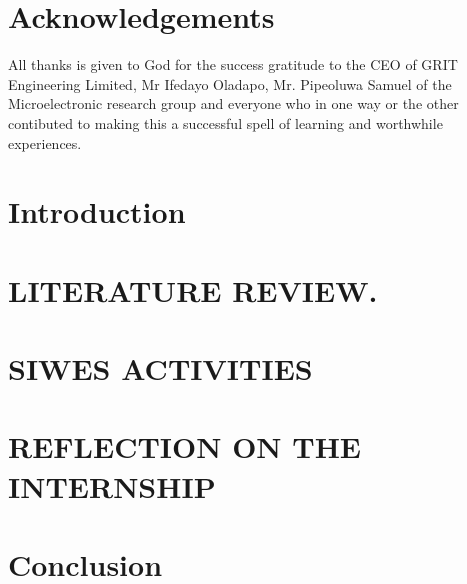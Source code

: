 \documentclass[12pt,twoside]{report}
\begin{document}

 
\chapter*{Acknowledgements}
All thanks is given to God for the success gratitude to the CEO of GRIT Engineering Limited, Mr Ifedayo Oladapo, Mr. Pipeoluwa Samuel of the Microelectronic research group and everyone who in one way or the other contibuted to making this a successful spell of learning and worthwhile experiences.

 
\tableofcontents


\listoffigures

\chapter{Introduction}

 
\chapter{LITERATURE REVIEW.}

 
\chapter{SIWES ACTIVITIES}

 
\chapter{REFLECTION ON THE INTERNSHIP}

 
\chapter{Conclusion}

%
%

\end{document}
